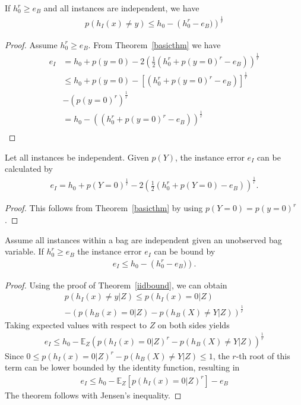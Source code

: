 \begin{theorema}
    If $h_0^r  \geq e_B$ and all instances are independent, we have
\begin{align}
    p(h_I(x)\neq y) \leq h_0 - \left ( h_0^r - e_B) \right ) ^ \frac{1}{r}
\end{align}
\begin{proof}
    Assume $h_0^r  \geq e_B$.
    From Theorem~\ref{basicthm} we have
\begin{align*}
   e_I &= h_0 + p(y=0) - 2 \left (\frac{1}{2} ( h_0^r + p(y=0)^r - e_B) \right)^\frac{1}{r}\\
   &\leq h_0 + p(y=0) - \left [( h_0^r + p(y=0)^r - e_B) \right]^\frac{1}{r}\\
   &- \left ( p(y=0)^r \right )^\frac{1}{r}\\
   &= h_0 - \left (( h_0^r + p(y=0)^r - e_B) \right)^\frac{1}{r}\\
\end{align*}
\end{proof}
\end{theorema}

\begin{theorema}
Let all instances be independent. Given $p(Y)$, the instance error $e_I$ can be calculated by
\begin{align}
e_I = h_0 + p(Y=0)^\frac{1}{r} - 2 \left (\frac{1}{2} ( h_0^r + p(Y=0) - e_B) \right)^\frac{1}{r}.
\end{align}
\begin{proof}
    This follows from Theorem~\ref{basicthm} by using $p(Y=0)=p(y=0)^r$.
\end{proof}
\end{theorema}

\begin{theorema}
    Assume all instances within a bag are independent given an unobserved bag variable. If $h_0^r \geq e_B$ the instance error $e_I$ can
    be bound by
\begin{align}
    e_I \leq h_0 -  \left ( h_0^r - e_B) \right ).
\end{align}
\begin{proof}
    Using the proof of Theorem~\ref{iidbound}, we can obtain
\begin{multline}
    p(h_I(x)\neq y| Z) \leq p(h_I(x)=0|Z) \\
    - \left ( p(h_B(x)=0|Z) - p(h_B(X)\neq Y| Z) \right ) ^ \frac{1}{r}
\end{multline}
Taking expected values with respect to $Z$ on both sides yields
\begin{align}
    e_I \leq h_0 - \mathbb{E}_Z \left ( p(h_I(x)=0|Z)^r - p(h_B(X)\neq Y| Z) \right ) ^ \frac{1}{r}
\end{align}
Since $0 \leq p(h_I(x)=0|Z)^r - p(h_B(X)\neq Y| Z) \leq 1$, the $r$-th root of this term can
be lower bounded by the identity function, resulting in
\begin{multline}
    e_I \leq h_0 - \mathbb{E}_Z \left[  p(h_I(x)=0|Z)^r \right] - e_B 
\end{multline}
The theorem follows with Jensen's inequality.
\end{proof}
\end{theorema}

